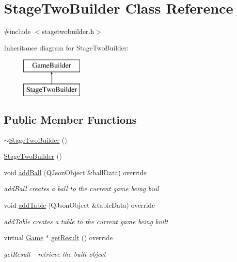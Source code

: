 \hypertarget{class_stage_two_builder}{}\section{Stage\+Two\+Builder Class Reference}
\label{class_stage_two_builder}


{\ttfamily \#include $<$stagetwobuilder.\+h$>$}

Inheritance diagram for Stage\+Two\+Builder\+:\begin{figure}[H]
\begin{center}
\leavevmode
\includegraphics[height=2.000000cm]{class_stage_two_builder}
\end{center}
\end{figure}
\subsection*{Public Member Functions}
\begin{DoxyCompactItemize}
\item 
\mbox{\hyperlink{class_stage_two_builder_a46f9a84e6bde6ed8504f3c3f9bad71f3}{$\sim$\+Stage\+Two\+Builder}} ()
\item 
\mbox{\hyperlink{class_stage_two_builder_a1cf9558f9d7487a87ffae237c8546f8e}{Stage\+Two\+Builder}} ()
\item 
void \mbox{\hyperlink{class_stage_two_builder_a8b2b783294c26b5f40d16bdd54d86301}{add\+Ball}} (Q\+Json\+Object \&ball\+Data) override
\begin{DoxyCompactList}\small\item\em add\+Ball creates a ball to the current game being buil \end{DoxyCompactList}\item 
void \mbox{\hyperlink{class_stage_two_builder_a7326ee514e752cab6d994352f5ef68e0}{add\+Table}} (Q\+Json\+Object \&table\+Data) override
\begin{DoxyCompactList}\small\item\em add\+Table creates a table to the current game being built \end{DoxyCompactList}\item 
virtual \mbox{\hyperlink{class_game}{Game}} $\ast$ \mbox{\hyperlink{class_stage_two_builder_ac40c00c49b18b7c4f83f4474a8cd9c73}{get\+Result}} () override
\begin{DoxyCompactList}\small\item\em get\+Result -\/ retrieve the built object \end{DoxyCompactList}\end{DoxyCompactItemize}
